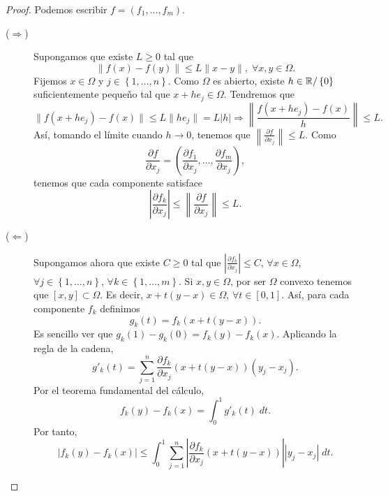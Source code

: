 \begin{proof}
	Podemos escribir $\displaystyle f = \left(f_{1}, \ldots, f_{m}\right) $. 
	\begin{description}
	\item[($\displaystyle \Rightarrow $)] Supongamos que existe $\displaystyle L \geq 0 $ tal que 
		\[\|f\left(x\right)-f\left(y\right)\|\leq L\|x-y\|, \; \forall x,y\in \Omega  .\]
		Fijemos $\displaystyle x \in \Omega  $ y $\displaystyle j\in \left\{ 1, \ldots, n\right\}  $. Como $\displaystyle \Omega  $ es abierto, existe $\displaystyle h\in \mathbb{R}/ \left\{ 0\right\}  $ suficientemente pequeño tal que $\displaystyle x + he_{j}\in \Omega  $. Tendremos que 
		\[\|f\left(x+he_{j}\right)-f\left(x\right)\|\leq L\|he_{j}\|=L \left|h\right| \Rightarrow \left\|\frac{f\left(x + he_{j}\right)-f\left(x\right)}{h}\right\|\leq L.\]
		Así, tomando el límite cuando $\displaystyle h \to 0 $, tenemos que $\displaystyle \left\|\frac{\partial f}{\partial x_{j}}\right\| \leq L$. 
		Como 
		\[\frac{\partial f}{\partial x_{j}}=\left(\frac{\partial f_{1}}{\partial x_{j}}, \ldots, \frac{\partial f_{m}}{\partial x_{j}}\right) ,\]
		tenemos que cada componente satisface
		\[ \left|\frac{\partial f_{k}}{\partial x_{j}}\right|\leq \left\|\frac{\partial f}{\partial x_{j}}\right\|\leq L .\]
	\item[($\displaystyle \Leftarrow $)] Supongamos ahora que existe $\displaystyle C \geq 0 $ tal que $\displaystyle \left|\frac{\partial f_{k}}{\partial x_{j}}\right|\leq C $, $\displaystyle \forall x \in \Omega  $, $\displaystyle \forall j \in \left\{ 1, \ldots, n\right\}  $, $\displaystyle \forall k \in \left\{ 1, \ldots, m\right\}  $. 
		Si $\displaystyle x,y\in \Omega  $, por ser $\displaystyle \Omega  $ convexo tenemos que $\displaystyle \left[x,y\right] \subset \Omega  $. Es decir, $\displaystyle x + t\left(y-x\right)\in \Omega  $, $\displaystyle \forall t \in \left[0,1\right]  $. Así, para cada componente $\displaystyle f_{k} $ definimos
		\[g_{k}\left(t\right)=f_{k}\left(x+t\left(y-x\right)\right) .\]
		Es sencillo ver que $\displaystyle g_{k}\left(1\right)-g_{k}\left(0\right)=f_{k}\left(y\right)-f_{k}\left(x\right) $. Aplicando la regla de la cadena,
		\[g'_{k}\left(t\right)=\sum^{n}_{j = 1}\frac{\partial f_{k}}{\partial x_{j}}\left(x+t\left(y-x\right)\right)\left(y_{j}-x_{j}\right) .\]
		Por el teorema fundamental del cálculo,
		\[f_{k}\left(y\right)-f_{k}\left(x\right)=\int^{1}_{0} g'_{k}\left(t\right) \; dt .\]
	Por tanto, 
	\[ \left|f_{k}\left(y\right)-f_{k}\left(x\right)\right|\leq \int^{1}_{0} \sum^{n}_{j = 1} \left|\frac{\partial f_{k}}{\partial x_{j}}\left(x + t\left(y-x\right)\right)\right| \left|y_{j}-x_{j}\right| \; dt .\]

\end{description}
\end{proof}
